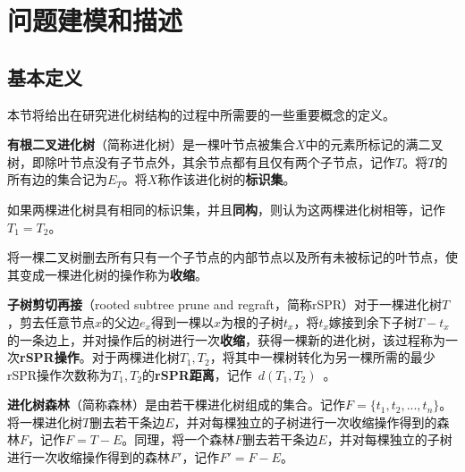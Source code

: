 
\chapter{问题建模和描述}
\section{基本定义}
本节将给出在研究进化树结构的过程中所需要的一些重要概念的定义。

\begin{dingyi}
\textbf{有根二叉进化树}（简称进化树）是一棵叶节点被集合$X$中的元素所标记的满二叉树，即除叶节点没有子节点外，其余节点都有且仅有两个子节点，记作$T$。将$T$的所有边的集合记为$E_T$。将\textbf{$X$}称作该进化树的\textbf{标识集}。
\end{dingyi}

\begin{dingyi}
如果两棵进化树具有相同的标识集，并且\textbf{同构}，则认为这两棵进化树相等，记作\textbf{$T_1 = T_2$}。
\end{dingyi}

\begin{dingyi}
将一棵二叉树删去所有只有一个子节点的内部节点以及所有未被标记的叶节点，使其变成一棵进化树的操作称为\textbf{收缩}。
\end{dingyi}

\begin{dingyi}
\textbf{子树剪切再接}（rooted subtree prune and regraft，简称rSPR）对于一棵进化树$T$，剪去任意节点$x$的父边$e_x$得到一棵以$x$为根的子树$t_x$，将$t_x$嫁接到余下子树$T-t_x$的一条边上，并对操作后的树进行一次\textbf{收缩}，获得一棵新的进化树，该过程称为一次\textbf{rSPR操作}。对于两棵进化树$T_1,T_2$，将其中一棵树转化为另一棵所需的最少rSPR操作次数称为$T_1,T_2$的\textbf{rSPR距离}，记作~$d(T_1,T_2)$~。
\end{dingyi}

\begin{dingyi}
\textbf{进化树森林}（简称森林）是由若干棵进化树组成的集合。记作$F=\{t_1,t_2,...,t_n\}$。将一棵进化树$T$删去若干条边$E$，并对每棵独立的子树进行一次收缩操作得到的森林$F$，记作\textbf{$F=T-E$}。同理，将一个森林$F$删去若干条边$E$，并对每棵独立的子树进行一次收缩操作得到的森林$F'$，记作\textbf{$F'=F-E$}。
\end{dingyi}

